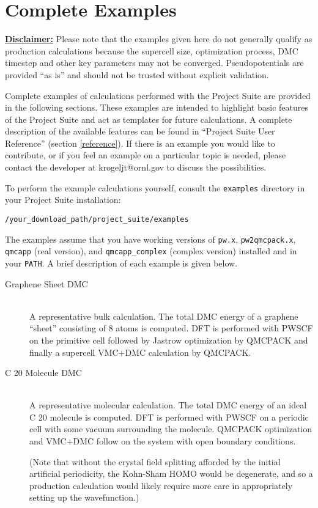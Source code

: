 \documentclass[oneside,11pt]{memoir}
\numberwithin{equation}{section}
\newcommand{\bu}[1]{\textbf{\underline{#1}}}
\begin{document}
\pagebreak
\chapter{Complete Examples} \label{examples}

\bu{Disclaimer:} Please note that the examples given here do not generally qualify as production 
calculations because the supercell size, optimization process, DMC timestep and 
other key parameters may not be converged.  Pseudopotentials are provided 
``as is'' and should not be trusted without explicit validation.

Complete examples of calculations performed with the Project Suite are provided 
in the following sections.  These examples are intended to highlight basic 
features of the Project Suite and act as templates for future calculations.  
A complete description of the available features can be found in ``Project 
Suite User Reference'' (section \ref{reference}).  If there is an example you 
would like to contribute, or if you feel an example on a particular topic is 
needed, please contact the developer at krogeljt@ornl.gov to discuss the 
possibilities.  

To perform the example calculations yourself, consult the \texttt{examples} 
directory in your Project Suite installation:
\begin{shaded}
\begin{verbatim}
/your_download_path/project_suite/examples
\end{verbatim}
\end{shaded}
The examples assume that you have working versions of \texttt{pw.x}, 
\texttt{pw2qmcpack.x}, \texttt{qmcapp} (real version), and 
\texttt{qmcapp\_complex} (complex version) installed and in your \texttt{PATH}. 
A brief description of each example is given below.  

\begin{description}
  \item[Graphene Sheet DMC] \hfill \\
    A representative bulk calculation.  The total DMC energy of a graphene 
    ``sheet'' consisting of 8 atoms is computed.  DFT is performed with 
    PWSCF on the primitive cell followed by Jastrow optimization by QMCPACK 
    and finally a supercell VMC+DMC calculation by QMCPACK.  

  \item[C 20 Molecule DMC] \hfill  \\
    A representative molecular calculation.  The total DMC energy of an ideal 
    C 20 molecule is computed.  DFT is performed with PWSCF on a periodic cell 
    with some vacuum surrounding the molecule.  QMCPACK optimization and 
    VMC+DMC follow on the system with open boundary conditions.  

    (Note that without the crystal field splitting afforded by the initial 
    artificial periodicity, the Kohn-Sham HOMO would be degenerate, and so a 
    production calculation would likely require more care in appropriately 
    setting up the wavefunction.)
\end{description}
\end{document}
